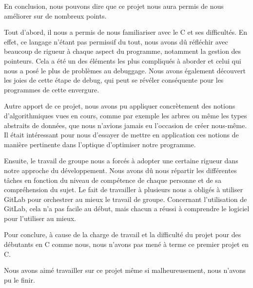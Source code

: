 En conclusion, nous pouvons dire que ce projet nous aura permis de nous améliorer sur de nombreux points.

\bigskip

Tout d'abord, il nous a permis de nous familiariser avec le C et ses difficultés. En effet, ce langage n'étant pas permissif du tout, nous avons dû réfléchir avec beaucoup de rigueur à chaque aspect du programme, notamment la gestion des pointeurs. Cela a été un des éléments les plus compliqués à aborder et celui qui nous a posé le plus de problèmes au debuggage. Nous avons également découvert les joies de cette étape de debug, qui peut se révéler conséquente pour les programmes de cette envergure.

\bigskip

Autre apport de ce projet, nous avons pu appliquer concrètement des notions d'algorithmiques vues en cours, comme par exemple les arbres ou même les types abstraits de données, que nous n'avions jamais eu l'occasion de créer nous-même. Il était intéressant pour nous d'essayer de mettre en application ces notions de manière pertinente dans l'optique d’optimiser notre programme.

\bigskip

Ensuite, le travail de groupe nous a forcés à adopter une certaine rigueur dans notre approche du développement. Nous avons dû nous répartir les différentes tâches en fonction du niveau de compétence de chaque personne et de sa compréhension du sujet. Le fait de travailler à plusieurs nous a obligés à utiliser GitLab pour orchestrer au mieux le travail de groupe. Concernant l’utilisation de GitLab, cela n’a pas facile au début, mais chacun a réussi à comprendre le logiciel pour l’utiliser au mieux.

\bigskip

Pour conclure, à cause de la charge de travail et la difficulté du projet pour des débutants en C comme nous, nous n’avons pas mené à terme ce premier projet en C.

\bigskip

Nous avons aimé travailler sur ce projet même si malheureusement, nous n’avons pu le finir.